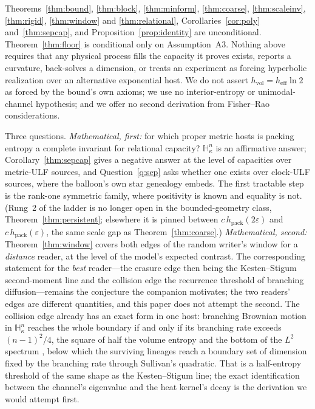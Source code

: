 \documentclass[11pt,reqno]{amsart}
\theoremstyle{plain}
\theoremstyle{definition}
\newcommand{\hpack}{h_{\mathrm{pack}}}
\newcommand{\hvol}{h_{\mathrm{vol}}}
\newcommand{\heff}{h_{\mathrm{eff}}}
\newcommand{\Hk}{\mathbb{H}^n_\kappa}
\newcommand{\eps}{\varepsilon}
\begin{document}
Theorems~\ref{thm:bound}, \ref{thm:block}, \ref{thm:minform}, \ref{thm:coarse}, \ref{thm:scaleinv}, \ref{thm:rigid}, \ref{thm:window} and \ref{thm:relational}, Corollaries~\ref{cor:poly} and~\ref{thm:sepcap}, and Proposition~\ref{prop:identity} are unconditional. Theorem~\ref{thm:floor} is conditional only on Assumption~A3. Nothing above requires that any physical process fills the capacity it proves exists, reports a curvature, back-solves a dimension, or treats an experiment as forcing hyperbolic realization over an alternative exponential host. We do not assert $\hvol=\heff\ln2$ as forced by the bound's own axioms; we use no interior-entropy or unimodal-channel hypothesis; and we offer no second derivation from Fisher--Rao considerations.

Three questions. \emph{Mathematical, first:} for which proper metric hosts is packing entropy a complete invariant for relational capacity? $\Hk$ is an affirmative answer; Corollary~\ref{thm:sepcap} gives a negative answer at the level of capacities over metric-ULF sources, and Question~\ref{q:sep} asks whether one exists over clock-ULF sources, where the balloon's own star genealogy embeds. The first tractable step is the rank-one symmetric family, where positivity is known \cite{tessera2008,kerr2022} and equality is not. (Rung~2 of the ladder is no longer open in the bounded-geometry class, Theorem~\ref{thm:persistent}; elsewhere it is pinned between $c\,\hpack(2\eps)$ and $c\,\hpack(\eps)$, the same scale gap as Theorem~\ref{thm:coarse}.) \emph{Mathematical, second:} Theorem~\ref{thm:window} covers both edges of the random writer's window for a \emph{distance} reader, at the level of the model's expected contrast. The corresponding statement for the \emph{best} reader---the erasure edge then being the Kesten--Stigum second-moment line and the collision edge the recurrence threshold of branching diffusion---remains the conjecture the companion motivates; the two readers' edges are different quantities, and this paper does not attempt the second. The collision edge already has an exact form in one host: branching Brownian motion in $\Hk$ reaches the whole boundary if and only if its branching rate exceeds $(n-1)^2/4$, the square of half the volume entropy and the bottom of the $L^2$ spectrum \cite{lalleysellke1997,kps1998}, below which the surviving lineages reach a boundary set of dimension fixed by the branching rate through Sullivan's quadratic. That is a half-entropy threshold of the same shape as the Kesten--Stigum line; the exact identification between the channel's eigenvalue and the heat kernel's decay is the derivation we would attempt first.
\end{document}
